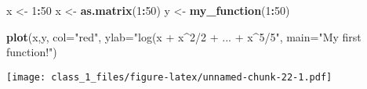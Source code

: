 \documentclass[]{article}
\newenvironment{Shaded}{\begin{snugshade}}{\end{snugshade}}
\newcommand{\KeywordTok}[1]{\textcolor[rgb]{0.13,0.29,0.53}{\textbf{#1}}}
\newcommand{\DataTypeTok}[1]{\textcolor[rgb]{0.13,0.29,0.53}{#1}}
\newcommand{\DecValTok}[1]{\textcolor[rgb]{0.00,0.00,0.81}{#1}}
\newcommand{\StringTok}[1]{\textcolor[rgb]{0.31,0.60,0.02}{#1}}
\newcommand{\OperatorTok}[1]{\textcolor[rgb]{0.81,0.36,0.00}{\textbf{#1}}}
\newcommand{\NormalTok}[1]{#1}
\begin{document}
\begin{Shaded}
\begin{Highlighting}[]
\NormalTok{x <-}\StringTok{ }\DecValTok{1}\OperatorTok{:}\DecValTok{50}
\NormalTok{x <-}\StringTok{ }\KeywordTok{as.matrix}\NormalTok{(}\DecValTok{1}\OperatorTok{:}\DecValTok{50}\NormalTok{)}
\NormalTok{y <-}\StringTok{ }\KeywordTok{my_function}\NormalTok{(}\DecValTok{1}\OperatorTok{:}\DecValTok{50}\NormalTok{)}


\KeywordTok{plot}\NormalTok{(x,y, }\DataTypeTok{col=}\StringTok{"red"}\NormalTok{, }\DataTypeTok{ylab=}\StringTok{"log(x + x^2/2 + ... + x^5/5"}\NormalTok{, }\DataTypeTok{main=}\StringTok{"My first function!"}\NormalTok{)}
\end{Highlighting}
\end{Shaded}

\texttt{[image: class\_1\_files/figure-latex/unnamed-chunk-22-1.pdf]}
\end{document}
